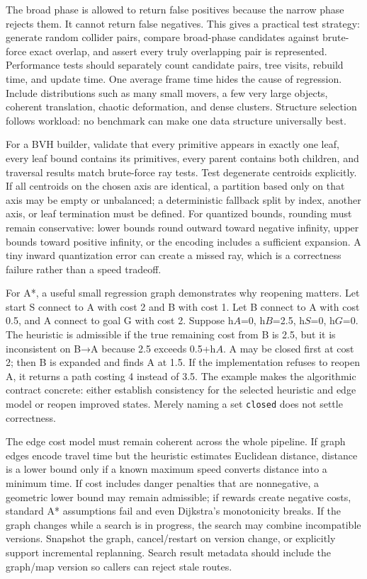 The broad phase is allowed to return false positives because the narrow phase rejects them. It cannot return false negatives. This gives a practical test strategy: generate random collider pairs, compare broad-phase candidates against brute-force exact overlap, and assert every truly overlapping pair is represented. Performance tests should separately count candidate pairs, tree visits, rebuild time, and update time. One average frame time hides the cause of regression. Include distributions such as many small movers, a few very large objects, coherent translation, chaotic deformation, and dense clusters. Structure selection follows workload: no benchmark can make one data structure universally best.

For a BVH builder, validate that every primitive appears in exactly one leaf, every leaf bound contains its primitives, every parent contains both children, and traversal results match brute-force ray tests. Test degenerate centroids explicitly. If all centroids on the chosen axis are identical, a partition based only on that axis may be empty or unbalanced; a deterministic fallback split by index, another axis, or leaf termination must be defined. For quantized bounds, rounding must remain conservative: lower bounds round outward toward negative infinity, upper bounds toward positive infinity, or the encoding includes a sufficient expansion. A tiny inward quantization error can create a missed ray, which is a correctness failure rather than a speed tradeoff.

For A*, a useful small regression graph demonstrates why reopening matters. Let start S connect to A with cost 2 and B with cost 1. Let B connect to A with cost 0.5, and A connect to goal G with cost 2. Suppose h\(A\)=0, h\(B\)=2.5, h\(S\)=0, h\(G\)=0. The heuristic is admissible if the true remaining cost from B is 2.5, but it is inconsistent on B→A because 2.5 exceeds 0.5+h\(A\). A may be closed first at cost 2; then B is expanded and finds A at 1.5. If the implementation refuses to reopen A, it returns a path costing 4 instead of 3.5. The example makes the algorithmic contract concrete: either establish consistency for the selected heuristic and edge model or reopen improved states. Merely naming a set \texttt{closed} does not settle correctness.

The edge cost model must remain coherent across the whole pipeline. If graph edges encode travel time but the heuristic estimates Euclidean distance, distance is a lower bound only if a known maximum speed converts distance into a minimum time. If cost includes danger penalties that are nonnegative, a geometric lower bound may remain admissible; if rewards create negative costs, standard A* assumptions fail and even Dijkstra's monotonicity breaks. If the graph changes while a search is in progress, the search may combine incompatible versions. Snapshot the graph, cancel/restart on version change, or explicitly support incremental replanning. Search result metadata should include the graph/map version so callers can reject stale routes.

